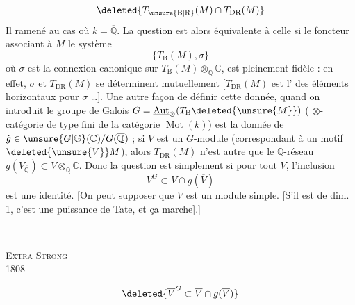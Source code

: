 \[
\deleted{T_{\unsure{\mathrm B|\mathrm R}}(M)\cap T_{\mathrm{DR}}(M)}
\]
Il   ramené au cas où $k=\overline{\mathbb Q}$. La question est alors équivalente à celle si le foncteur associant à $M$ le système
\begingroup\makeatletter\tagsleft@true\makeatother
\[
\bigl\{T_{\mathrm B}(M),\sigma\bigr\} \tag*{(4.2)}
\]
\endgroup
où $\sigma$ est la connexion canonique sur $T_{\mathrm B}(M)\otimes_{\mathbb Q}\mathbb C$, est pleinement fidèle : en effet, $\sigma$ et $T_{\mathrm{DR}}(M)$ se déterminent mutuellement [$T_{\mathrm{DR}}(M)$ est l' des éléments  horizontaux pour $\sigma$ \ldots].
Une autre façon de définir cette donnée,  quand on introduit le groupe de Galois $G=\underline{\operatorname{Aut}}_{\otimes}(T_{\mathrm B}\deleted{\unsure{M}})$  ( $\otimes$-catégorie de type fini de la catégorie $\operatorname{Mot}(k)$) est la donnée de $\dot g\in\unsure{G|\mathbb G}(\mathbb C)/G(\overline{\mathbb Q})$ ; si $V$ est un $G$-module (correspondant à un motif $\deleted{\unsure{V}}M$), alors
$T_{\mathrm{DR}}(M)$ n'est autre que le $\overline{\mathbb Q}$-réseau $g(V_{\overline{\mathbb Q}})\subset V\otimes_{\mathbb Q}\mathbb C$. Donc la question est simplement si pour tout $V$, l'inclusion
\[
V^G\subset V\cap g(\overline V)
\]
est une identité. [On peut supposer que $V$ est un module simple. [S'il est de dim. 1, c'est une puissance de Tate, et ça marche].] 
\par\hfill - - - - - - - - - -
\par\noindent\textsc{Extra Strong}\\
 1808

\[
\deleted{\overline V^{G}\subset\overline V\cap g(\overline V)}
\]

